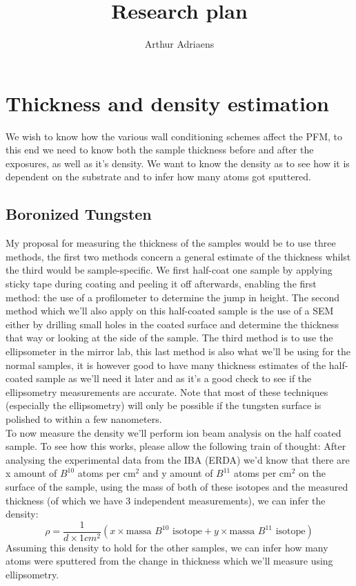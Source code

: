 \documentclass{article}
\title{Research plan}
\author{Arthur Adriaens}
\begin{document}
\maketitle

\section{Thickness and density estimation}
We wish to know how the various wall conditioning schemes affect the PFM, to
this end we need to know both the sample thickness before and after the
exposures, as well as it's density.  We want to know the density as to see how
it is dependent on the substrate and to infer how many atoms got sputtered.
\subsection{Boronized Tungsten}
My proposal for measuring the thickness
of the samples would be to use three methods, the first two methods concern a
general estimate of the thickness whilst the third would be sample-specific.
We first half-coat one sample by applying sticky tape during coating and
peeling it off afterwards, enabling the first method: the use of a profilometer
to determine the jump in height. The second method which we'll also apply on
this half-coated sample is the use of a SEM either by drilling small holes in
the coated surface and determine the thickness that way or looking at the side
of the sample.  The third method is to use the ellipsometer in the mirror lab,
this last method is also what we'll be using for the normal samples, it is
however good to have many thickness estimates of the half-coated sample as
we'll need it later and as it's a good check to see if the ellipsometry
measurements are accurate.  Note that most of these techniques (especially the
ellipsometry) will only be possible if the tungsten surface is polished to within
a few nanometers.
 \vspace{0.2cm} \\
To now measure the density we'll perform ion beam analysis on the half coated
sample. To see how this works, please allow the following train of thought: After
analysing the experimental data from the IBA (ERDA) we'd know that there are x amount
of $B^{10}$ atoms per cm$^2$ and y amount of $B^{11}$ atoms per cm$^2$ on the
surface of the sample, using the mass of both of these isotopes and the
measured thickness (of which we have 3 independent measurements), we can infer
the density:
\begin{equation}
    \rho = \frac{1}{d \times 1 cm^2} \left( x \times \text{massa }B^{10}   \text{ isotope} + y \times \text{massa }B^{11}   \text{ isotope}\right)
\end{equation}
Assuming this density to hold for the other samples, we can infer how many atoms 
were sputtered from the change in thickness which we'll measure using ellipsometry.
\end{document}
